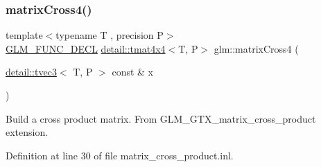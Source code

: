 \subsubsection{\texorpdfstring{matrix\+Cross4()}{matrixCross4()}}
{\footnotesize\ttfamily template$<$typename T , precision P$>$ \\
\hyperlink{setup_8hpp_ab2d052de21a70539923e9bcbf6e83a51}{G\+L\+M\+\_\+\+F\+U\+N\+C\+\_\+\+D\+E\+CL} \hyperlink{structglm_1_1detail_1_1tmat4x4}{detail\+::tmat4x4}$<$T, P$>$ glm\+::matrix\+Cross4 (\begin{DoxyParamCaption}\item[{\hyperlink{structglm_1_1detail_1_1tvec3}{detail\+::tvec3}$<$ T, P $>$ const \&}]{x }\end{DoxyParamCaption})}

Build a cross product matrix. From G\+L\+M\+\_\+\+G\+T\+X\+\_\+matrix\+\_\+cross\+\_\+product extension. 

Definition at line 30 of file matrix\+\_\+cross\+\_\+product.\+inl.


